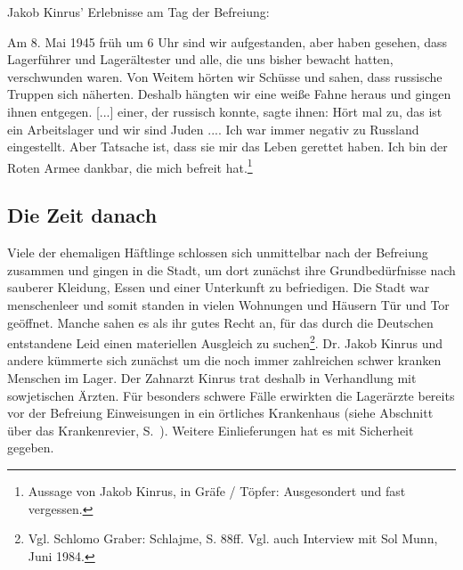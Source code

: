 Jakob Kinrus' Erlebnisse am Tag der Befreiung:
\begin{leftbar} 
Am 8. Mai 1945 früh um 6 Uhr sind wir aufgestanden, aber haben gesehen, dass Lagerführer und Lagerältester und alle, die uns bisher bewacht hatten, verschwunden waren. Von Weitem hörten wir Schüsse und sahen, dass russische Truppen sich näherten. Deshalb hängten wir eine weiße Fahne heraus und gingen ihnen entgegen. [...] einer, der russisch konnte, sagte ihnen: \glqq Hört mal zu, das ist ein Arbeitslager und wir sind Juden ...\grqq. Ich war immer negativ zu Russland eingestellt. Aber Tatsache ist, dass sie mir das Leben gerettet haben. Ich bin der Roten Armee dankbar, die mich befreit hat.\footnote{Aussage von Jakob Kinrus, in Gräfe / Töpfer: Ausgesondert und fast vergessen.}
\end{leftbar}




\subsection{Die Zeit danach}
Viele der ehemaligen Häftlinge schlossen sich unmittelbar nach der Befreiung zusammen und gingen in die Stadt, um dort zunächst ihre Grundbedürfnisse nach sauberer Kleidung, Essen und einer Unterkunft zu befriedigen. Die Stadt war menschenleer und somit standen in vielen Wohnungen und Häusern Tür und Tor geöffnet. Manche sahen es als ihr gutes Recht an, für das durch die Deutschen entstandene Leid einen materiellen Ausgleich zu suchen\footnote{Vgl. Schlomo Graber: Schlajme, S. 88ff. Vgl. auch Interview mit Sol Munn,  Juni 1984.}. Dr. Jakob Kinrus und andere kümmerte sich zunächst um die noch immer zahlreichen schwer kranken Menschen im Lager. Der Zahnarzt Kinrus trat deshalb in Verhandlung mit sowjetischen Ärzten. Für besonders schwere Fälle erwirkten die Lagerärzte bereits vor der Befreiung Einweisungen in ein örtliches Krankenhaus (siehe Abschnitt über das Krankenrevier, S.~\pageref{krankenhaus}). Weitere Einlieferungen hat es mit Sicherheit gegeben. 

